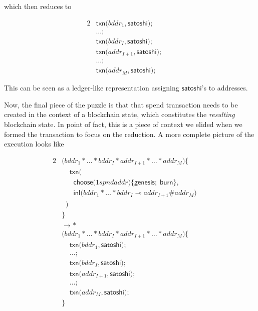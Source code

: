 \documentclass[]{acm_proc_article-sp}
\numberwithin{equation}{subsection}
\begin{document}
which then reduces to

\begin{alignat*}{2}
  &\mathsf{txn}\mathsf{(} bddr_1, \mathsf{satoshi} \mathsf{)} \mathsf{;} && \\
  &\ldots \mathsf{;} && \\
  &\mathsf{txn}\mathsf{(} bddr_I, \mathsf{satoshi} \mathsf{)} \mathsf{;} && \\
  &\mathsf{txn}\mathsf{(} addr_{I+1}, \mathsf{satoshi} \mathsf{)} \mathsf{;} && \\
  &\ldots \mathsf{;} && \\
  &\mathsf{txn}\mathsf{(} addr_M, \mathsf{satoshi} \mathsf{)} \mathsf{;} &&
\end{alignat*} 

This can be seen as a ledger-like representation assigning
$\mathsf{satoshi}$'s to addresses.

Now, the final piece of the puzzle is that that spend transaction
needs to be created in the context of a blockchain state, which
constitutes the \emph{resulting} blockchain state. In point of fact,
this is a piece of context we elided when we formed the transaction to
focus on the reduction. A more complete picture of the execution looks like

\begin{alignat*}{2}
  &\mathsf{(} bddr_1 * \ldots * bddr_I * addr_{I+1} * \ldots * addr_M  \mathsf{)} \mathsf{\{} && \\
  &\;\;\;\;\mathsf{txn}\mathsf{(} && \\
  &\;\;\;\;\;\;\mathsf{choose}\mathsf{(} 1spndaddr \mathsf{)}\mathsf{\{} \mathsf{genesis}\mathsf{;}\; \mathsf{burn} \mathsf{\}}, && \\
  &\;\;\;\;\;\;\mathsf{inl}\mathsf{(} bddr_1 * \ldots * bddr_I \multimap addr_{I+1} \# addr_M \mathsf{)} && \\
  &\;\;\mathsf{)} && \\
  &\mathsf{\}} && \\
  &\rightarrow* && \\
  &\mathsf{(} bddr_1 * \ldots * bddr_I * addr_{I+1} * \ldots * addr_M  \mathsf{)} \mathsf{\{} && \\
  &\;\;\;\;\mathsf{txn}\mathsf{(} bddr_1, \mathsf{satoshi} \mathsf{)} \mathsf{;}&& \\
  &\;\;\;\;\ldots \mathsf{;} && \\
  &\;\;\;\;\mathsf{txn}\mathsf{(} bddr_I, \mathsf{satoshi} \mathsf{)} \mathsf{;} && \\
  &\;\;\;\;\mathsf{txn}\mathsf{(} addr_{I+1}, \mathsf{satoshi} \mathsf{)} \mathsf{;} && \\
  &\;\;\;\;\ldots \mathsf{;} && \\
  &\;\;\;\;\mathsf{txn}\mathsf{(} addr_M, \mathsf{satoshi} \mathsf{)} \mathsf{;} && \\
  &\mathsf{\}} &&
\end{alignat*}
\end{document}
